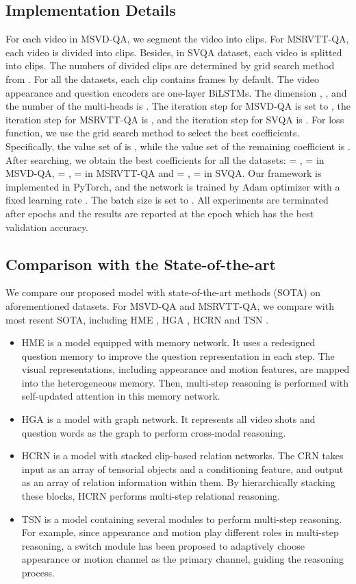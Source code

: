 \documentclass[journal]{IEEEtran}
\begin{document}
\subsection{Implementation Details}
For each video in MSVD-QA, we segment the video into  clips. For MSRVTT-QA, each video is divided into  clips. Besides, in SVQA dataset, each video is splitted into  clips. The numbers of divided clips are determined by grid search method from . For all the datasets, each clip contains  frames by default. The video appearance and question encoders are one-layer BiLSTMs. The dimension , , and the number of the multi-heads  is . The iteration step  for MSVD-QA is set to , the iteration step  for MSRVTT-QA is , and the iteration step  for SVQA is . For loss function, we use the grid search method to select the best coefficients. Specifically, the value set of  is , while the value set of the remaining coefficient  is . After searching, we obtain the best coefficients for all the datasets:  = ,  =  in MSVD-QA,  = ,  =  in MSRVTT-QA and  = ,  =  in SVQA. Our framework is implemented in PyTorch, and the network is trained by Adam optimizer with a fixed learning rate . The batch size is set to . All experiments are terminated after  epochs and the results are reported at the epoch which has the best validation accuracy.

\subsection{Comparison with the State-of-the-art}
We compare our proposed model with state-of-the-art methods (SOTA) on aforementioned datasets. For MSVD-QA and MSRVTT-QA, we compare with most resent SOTA, including HME \cite{fan2019heterogeneous}, HGA \cite{jiang2020reasoning}, HCRN \cite{le2020hierarchical} and TSN \cite{yang2019question}.
\begin{itemize}
    \item HME is a model equipped with memory network. It uses a redesigned question memory to improve the question representation in each step. The visual representations, including appearance and motion features, are mapped into the heterogeneous memory. Then, multi-step reasoning is performed with self-updated attention in this memory network.
    \item HGA is a model with graph network. It represents all video shots and question words as the graph to perform cross-modal reasoning.
    \item HCRN is a model with stacked clip-based relation networks. The CRN takes input as an array of tensorial objects and a conditioning feature, and output as an array of relation information within them. By hierarchically stacking these blocks, HCRN performs multi-step relational reasoning.
    \item TSN is a model containing several modules to perform multi-step reasoning. For example, since appearance and motion play different roles in multi-step reasoning, a switch module has been proposed to adaptively choose appearance or motion channel as the primary channel, guiding the reasoning process. 
\end{itemize}
\end{document}
